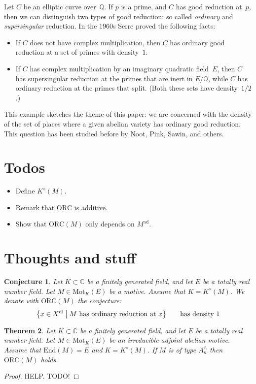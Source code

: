 \documentclass{amsart}
\newtheorem{thm}{Theorem}[section]
\newtheorem{cnj}[thm]{Conjecture}
\begin{document}
Let $C$ be an elliptic curve over~$\mathbb{Q}$.
If $p$ is a prime, and $C$ has good reduction at~$p$,
then we can distinguish two types of good reduction:
so called \emph{ordinary} and \emph{supersingular} reduction.
In the 1960s %
Serre proved the following facts:
\begin{itemize}
 \item If $C$ does not have complex multiplication,
  then $C$ has ordinary good reduction at
  a set of primes with density~$1$.
 \item If $C$ has complex multiplication by an
  imaginary quadratic field~$E$,
  then $C$ has supersingular reduction
  at the primes that are inert in $E/\mathbb{Q}$,
  while $C$ has ordinary reduction at the primes that split.
  (Both these sets have density~$1/2$.)
\end{itemize}
This example sketches the theme of this paper:
we are concerned with the density of the set of places
where a given abelian variety has ordinary good reduction.
This question has been studied before by
Noot, Pink, Sawin, and others.

\section{Todos}

\begin{itemize}
 \item Define $K^\diamond(M)$.
 \item Remark that $\mathrm{ORC}$ is additive.
 \item Show that $\mathrm{ORC}(M)$ only depends on $M^\mathrm{ad}$.
\end{itemize}

\section{Thoughts and stuff}

\begin{cnj}
 Let $K \subset \mathbb{C}$ be a finitely generated field,
 and let $E$ be a totally real number field.
 Let $M \in \mathrm{Mot}_K(E)$ be a motive.
 Assume that $K = K^\diamond(M)$.
 We denote with $\mathrm{ORC}(M)$ the conjecture:
 \[
  \bigl\{ x \in X^\mathrm{cl} \bigm|
  M~\text{has ordinary reduction at~$x$}\bigr\} \qquad\text{has density~$1$}
 \]
\end{cnj}

\begin{thm}
 Let $K \subset \mathbb{C}$ be a finitely generated field,
 and let $E$ be a totally real number field.
 Let $M \in \mathrm{Mot}_K(E)$ be an irreducible adjoint abelian motive.
 Assume that $\mathrm{End}(M) = E$ and $K = K^\diamond(M)$.
 If $M$ is of type $A_n^\wedge$ then $\mathrm{ORC}(M)$ holds.
\end{thm}
\begin{proof}
 HELP. TODO!
\end{proof}
\end{document}
